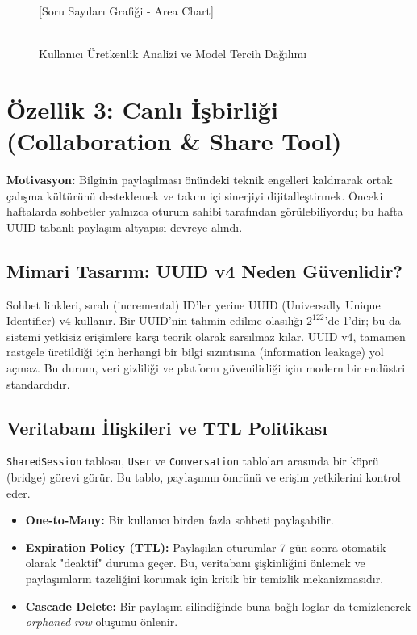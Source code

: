 \documentclass[12pt,a4paper]{article}
\begin{document}
\begin{figure}[H]
  \centering
  \begin{tcolorbox}[colback=white, colframe=noteborder, title=Görsel 2: Haftalık Veri Analiz Ekranı]
    \small
    [Soru Sayıları Grafiği - Area Chart] \\
    [En Çok Kullanılan Model: GPT-4o (\%60)] \\
    [Toplam Harcanan Token Tahmini: 25k]
  \end{tcolorbox}
  \caption{Kullanıcı Üretkenlik Analizi ve Model Tercih Dağılımı}
\end{figure}

\section{Özellik 3: Canlı İşbirliği (Collaboration \& Share Tool)}

\textbf{Motivasyon:} Bilginin paylaşılması önündeki teknik engelleri kaldırarak ortak çalışma kültürünü desteklemek ve takım içi sinerjiyi dijitalleştirmek. Önceki haftalarda sohbetler yalnızca oturum sahibi tarafından görülebiliyordu; bu hafta UUID tabanlı paylaşım altyapısı devreye alındı.

\subsection{Mimari Tasarım: UUID v4 Neden Güvenlidir?}
Sohbet linkleri, sıralı (incremental) ID'ler yerine UUID (Universally Unique Identifier) v4 kullanır. Bir UUID'nin tahmin edilme olasılığı $2^{122}$'de 1'dir; bu da sistemi yetkisiz erişimlere karşı teorik olarak sarsılmaz kılar. UUID v4, tamamen rastgele üretildiği için herhangi bir bilgi sızıntısına (information leakage) yol açmaz. Bu durum, veri gizliliği ve platform güvenilirliği için modern bir endüstri standardıdır.

\subsection{Veritabanı İlişkileri ve TTL Politikası}
\texttt{SharedSession} tablosu, \texttt{User} ve \texttt{Conversation} tabloları arasında bir köprü (bridge) görevi görür. Bu tablo, paylaşımın ömrünü ve erişim yetkilerini kontrol eder.

\begin{itemize}[leftmargin=*]
    \item \textbf{One-to-Many:} Bir kullanıcı birden fazla sohbeti paylaşabilir.
    \item \textbf{Expiration Policy (TTL):} Paylaşılan oturumlar 7 gün sonra otomatik olarak "deaktif" duruma geçer. Bu, veritabanı şişkinliğini önlemek ve paylaşımların tazeliğini korumak için kritik bir temizlik mekanizmasıdır.
    \item \textbf{Cascade Delete:} Bir paylaşım silindiğinde buna bağlı loglar da temizlenerek \textit{orphaned row} oluşumu önlenir.
\end{itemize}
\end{document}
